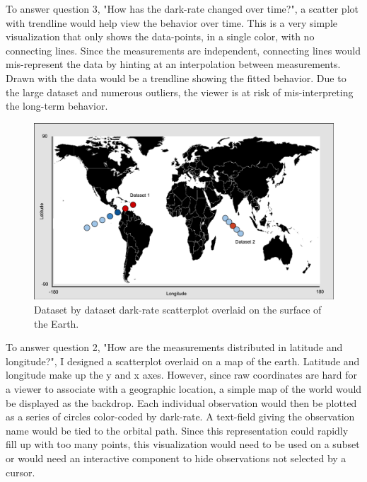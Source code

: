\documentclass[a4paper,11pt]{article}
\begin{document}
To answer question 3, "How has the dark-rate changed over time?", a scatter plot with trendline would help view the behavior over time.  This is a very simple visualization that only shows the data-points, in a single color, with no connecting lines.  Since the measurements are independent, connecting lines would mis-represent the data by hinting at an interpolation between measurements.  Drawn with the data would be a trendline showing the fitted behavior.  Due to the large dataset and numerous outliers, the viewer is at risk of mis-interpreting the long-term behavior.   

\begin{figure}[h!]
\caption{Dataset by dataset dark-rate scatterplot overlaid on the surface of the Earth.} 
\centering
\includegraphics[width=.9\textwidth]{world.png}
\end{figure}

To answer question 2, "How are the measurements distributed in latitude and longitude?", I designed a scatterplot overlaid on a map of the earth.  Latitude and longitude make up the y and x axes.  However, since raw coordinates are hard for a viewer to associate with a geographic location, a simple map of the world would be displayed as the backdrop.  Each individual observation would then be plotted as a series of circles color-coded by dark-rate.  A text-field giving the observation name would be tied to the orbital path.  Since this representation could rapidly fill up with too many points, this visualization would need to be used on a subset or would need an interactive component to hide observations not selected by a cursor. 

\end{document}
